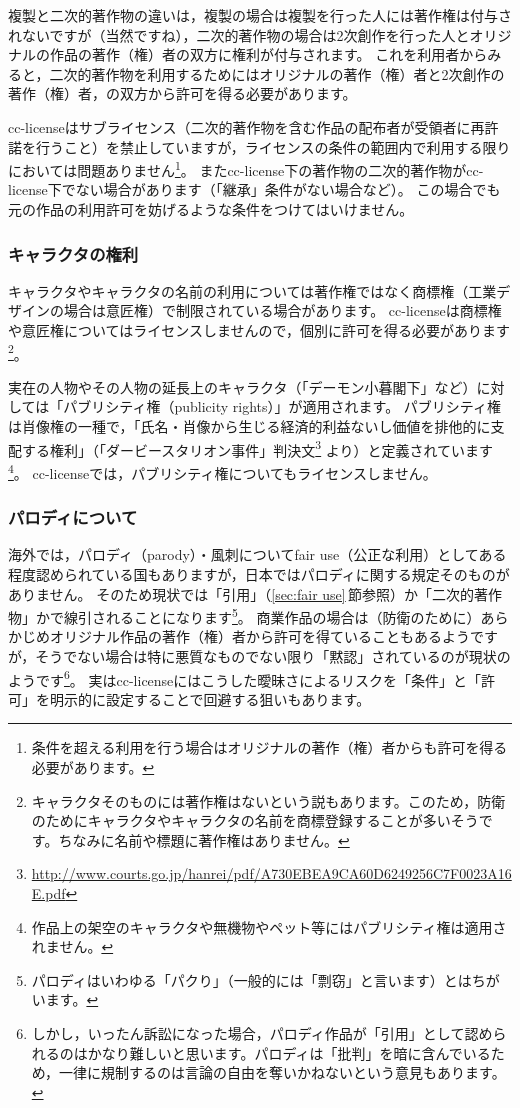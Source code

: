 \documentclass{ltjsarticle}
\begin{document}
複製と二次的著作物の違いは，複製の場合は複製を行った人には著作権は付与されないですが（当然ですね），二次的著作物の場合は2次創作を行った人とオリジナルの作品の著作（権）者の双方に権利が付与されます。
これを利用者からみると，二次的著作物を利用するためにはオリジナルの著作（権）者と2次創作の著作（権）者，の双方から許可を得る必要があります。

cc-licenseはサブライセンス（二次的著作物を含む作品の配布者が受領者に再許諾を行うこと）を禁止していますが，ライセンスの条件の範囲内で利用する限りにおいては問題ありません\footnote{条件を超える利用を行う場合はオリジナルの著作（権）者からも許可を得る必要があります。}。
またcc-license下の著作物の二次的著作物がcc-license下でない場合があります（「継承」条件がない場合など）。
この場合でも元の作品の利用許可を妨げるような条件をつけてはいけません。

\subsubsection{キャラクタの権利}

キャラクタやキャラクタの名前の利用については著作権ではなく商標権（工業デザインの場合は意匠権）で制限されている場合があります。
cc-licenseは商標権や意匠権についてはライセンスしませんので，個別に許可を得る必要があります\footnote{キャラクタそのものには著作権はないという説もあります。このため，防衛のためにキャラクタやキャラクタの名前を商標登録することが多いそうです。ちなみに名前や標題に著作権はありません。}。

実在の人物やその人物の延長上のキャラクタ（「デーモン小暮閣下」など）に対しては「パブリシティ権（publicity rights）」が適用されます。
パブリシティ権は肖像権の一種で，「氏名・肖像から生じる経済的利益ないし価値を排他的に支配する権利」（「ダービースタリオン事件」判決文\footnote{\url{http://www.courts.go.jp/hanrei/pdf/A730EBEA9CA60D6249256C7F0023A16E.pdf}} より）と定義されています\footnote{作品上の架空のキャラクタや無機物やペット等にはパブリシティ権は適用されません。}。
cc-licenseでは，パブリシティ権についてもライセンスしません。

\subsubsection{パロディについて}

海外では，パロディ（parody）・風刺についてfair use（公正な利用）としてある程度認められている国もありますが，日本ではパロディに関する規定そのものがありません。
そのため現状では「引用」（\ref{sec:fair use}\,節参照）か「二次的著作物」かで線引されることになります\footnote{パロディはいわゆる「パクり」（一般的には「剽窃」と言います）とはちがいます。}。
商業作品の場合は（防衛のために）あらかじめオリジナル作品の著作（権）者から許可を得ていることもあるようですが，そうでない場合は特に悪質なものでない限り「黙認」されているのが現状のようです\footnote{しかし，いったん訴訟になった場合，パロディ作品が「引用」として認められるのはかなり難しいと思います。パロディは「批判」を暗に含んでいるため，一律に規制するのは言論の自由を奪いかねないという意見もあります。}。
実はcc-licenseにはこうした曖昧さによるリスクを「条件」と「許可」を明示的に設定することで回避する狙いもあります。
\end{document}
